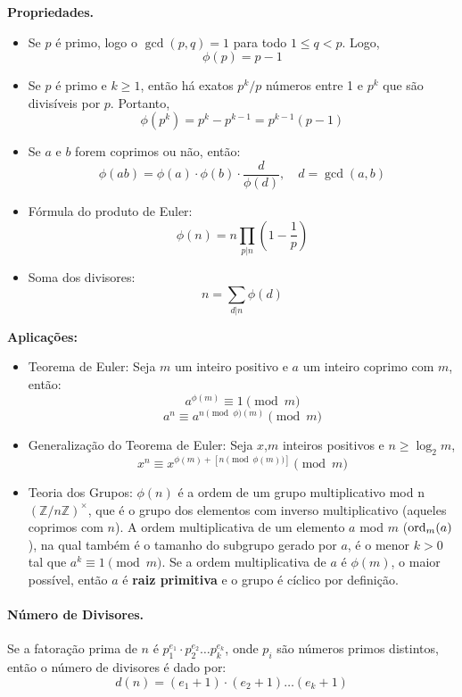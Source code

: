 \textbf{Propriedades.}
\begin{multicols}{2}
    \begin{itemize}
        \item Se $p$ é primo, logo o $\gcd(p,q) = 1$ para todo $1\leq q < p$. Logo,
        $$\phi(p) = p-1$$
        \item Se $p$ é primo e $k \ge 1$, então há exatos $p^k/p$ números entre 1 e $p^k$ que são divisíveis por $p$. Portanto,
        $$\phi(p^k) = p^k - p^{k-1} = p^{k-1}(p-1)$$
        \item Se $a$ e $b$ forem coprimos ou não, então:
        $$\phi(ab)=\phi(a)\cdot \phi(b) \cdot \frac{d}{\phi(d)},\quad d = \gcd(a,b)$$
        \item Fórmula do produto de Euler:
        $$\phi(n)=n\prod_{p|n}(1-\frac{1}{p})$$
        \item Soma dos divisores:
        $$n = \sum_{d|n}\phi(d)$$
    \end{itemize}
    
\end{multicols}

\textbf{Aplicações:}
\begin{itemize}
    \item Teorema de Euler: Seja $m$ um inteiro positivo e $a$ um inteiro coprimo com $m$, então:
    $$a^{\phi(m)} \equiv 1 \pmod m$$
    $$a^n \equiv a^{n \pmod \phi(m)} \pmod m$$
    
    \item Generalização do Teorema de Euler: Seja $x$,$m$ inteiros positivos e $n \ge \log_2m$,
    $$x^n \equiv x^{\phi(m)+[n \pmod{\phi(m)}]} \pmod m$$
    
    \item Teoria dos Grupos: $\phi(n)$ é a ordem de um grupo multiplicativo mod n $(\mathbb{Z}/n\mathbb{Z})^{\times}$, que é o grupo dos elementos com inverso multiplicativo (aqueles coprimos com $n$). A ordem multiplicativa de um elemento $a$ mod $m$ ($\textnormal{ord}_m(a)$), na qual também é o tamanho do subgrupo gerado por $a$, é o menor $k > 0$ tal que $a^k \equiv 1 \pmod m$. Se a ordem multiplicativa de $a$ é $\phi(m)$, o maior possível, então $a$ é \textbf{raiz primitiva} e o grupo é cíclico por definição.
    
\end{itemize}

\paragraph{Número de Divisores.} Se a fatoração prima de $n$ é $p_1^{e_1}\cdot p_2^{e_2}\dots  p_k^{e_k}$, onde $p_i$ são números primos distintos, então o número de divisores é dado por:
$$d(n) = (e_1+1)\cdot(e_2+1) \dots (e_k+1)$$

